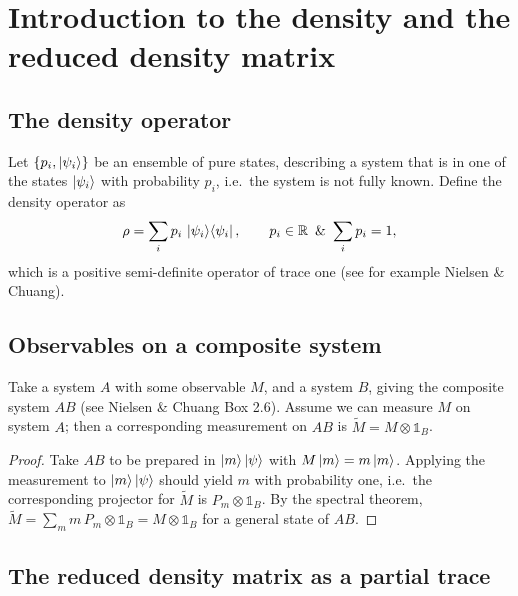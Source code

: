\documentclass[../../main.tex]{subfiles}
\begin{document}
\section{Introduction to the density and the reduced density matrix}
\label{sec:density-and-reduced-density-matrix}

\subsection{The density operator}

Let $\{p_i,\left\lvert \psi_i \right\rangle\}$ be an ensemble of pure states, describing a system that is in one
of the states $\left\lvert \psi_i \right\rangle$ with probability $p_i$, i.e.\ the system is not fully known. Define
the density operator as
\begin{equation}
\rho=\sum_i p_i\,\left\lvert \psi_i \right\rangle\!\left\langle \psi_i \right\rvert,\qquad p_i\in\mathbb R\ \, \&\ \sum_i p_i=1,
\end{equation}
which is a positive semi-definite operator of trace one (see for example Nielsen \& Chuang).

\subsection{Observables on a composite system}

Take a system $A$ with some observable $M$, and a system $B$, giving the composite system
$AB$ (see Nielsen \& Chuang Box 2.6). Assume we can measure $M$ on system $A$; then a corresponding measurement
on $AB$ is $\tilde M=M\otimes\mathds{1}_B$.

\begin{proof}
Take $AB$ to be prepared in $\left\lvert m \right\rangle\left\lvert \psi \right\rangle$ with $M\left\lvert m \right\rangle=m\left\lvert m \right\rangle$. Applying the
measurement to $\left\lvert m \right\rangle\left\lvert \psi \right\rangle$ should yield $m$ with probability one, i.e.\ the
corresponding projector for $\tilde M$ is $P_m\otimes\mathds{1}_B$. By the spectral theorem,
$\tilde M=\sum_m m\,P_m\otimes\mathds{1}_B=M\otimes\mathds{1}_B$ for a general state of $AB$.
\end{proof}

\subsection{The reduced density matrix as a partial trace}
\end{document}
